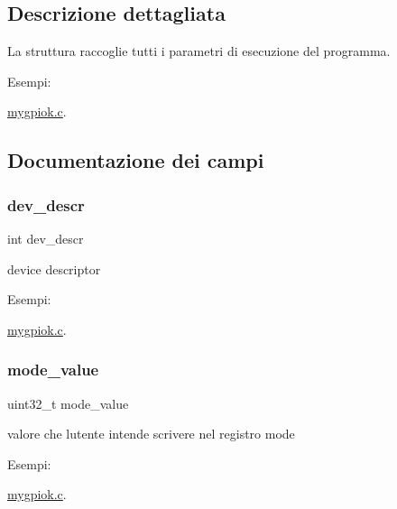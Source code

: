 \subsection{Descrizione dettagliata}
La struttura raccoglie tutti i parametri di esecuzione del programma. \begin{Desc}
\item[Esempi\+: ]\par
\hyperlink{mygpiok_8c-example}{mygpiok.\+c}.\end{Desc}


\subsection{Documentazione dei campi}
\mbox{\label{structparam__t_a52701f5f8091598d5c5ac1bb80cd2070}} 
\subsubsection{\texorpdfstring{dev\+\_\+descr}{dev\_descr}}
{\footnotesize\ttfamily int dev\+\_\+descr}



device descriptor 

\begin{Desc}
\item[Esempi\+: ]\par
\hyperlink{mygpiok_8c-example}{mygpiok.\+c}.\end{Desc}
\mbox{\label{structparam__t_a007b34e09ccda08824bc74ab9d86c5a8}} 
\subsubsection{\texorpdfstring{mode\+\_\+value}{mode\_value}}
{\footnotesize\ttfamily uint32\+\_\+t mode\+\_\+value}



valore che l\textquotesingle{}utente intende scrivere nel registro mode 

\begin{Desc}
\item[Esempi\+: ]\par
\hyperlink{mygpiok_8c-example}{mygpiok.\+c}.\end{Desc}
\mbox{\label{structparam__t_aec948fb30e99b1eda7e3d9ff741d417a}} 
